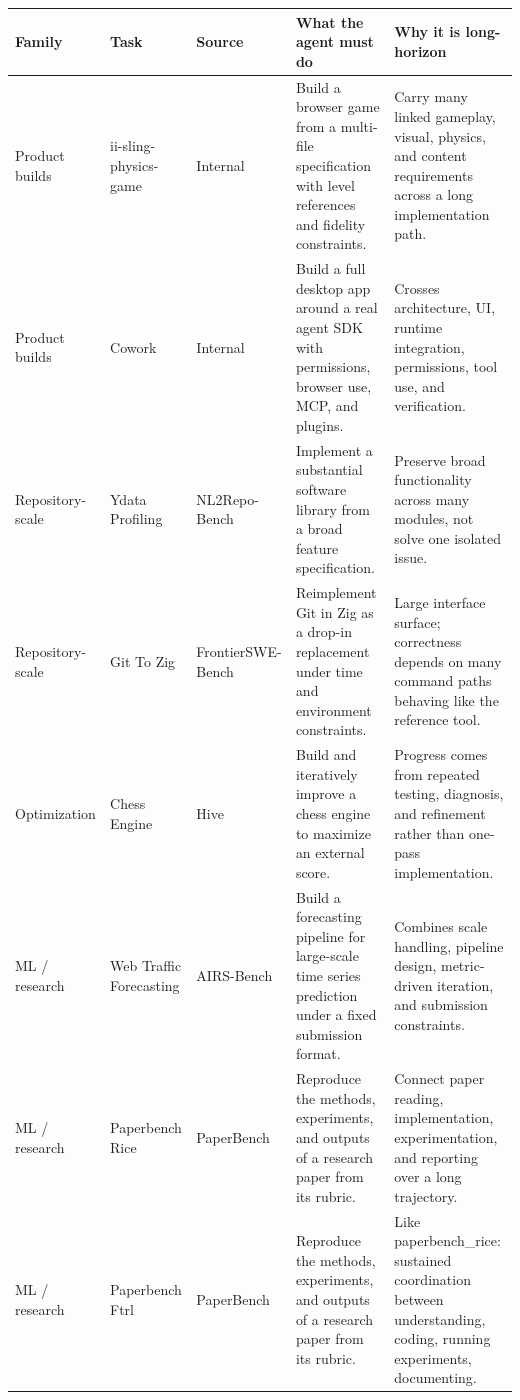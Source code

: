 \documentclass[11pt,a4paper]{article}
\renewcommand{\arraystretch}{1.18}
\newcommand{\code}[1]{#1}
\begin{document}
\begingroup
\renewcommand{\arraystretch}{1.25}
\setlength{\tabcolsep}{4pt}
\footnotesize
\noindent\begin{longtable}{@{}>{\raggedright\arraybackslash}p{2.0cm}>{\raggedright\arraybackslash}p{2.2cm}>{\raggedright\arraybackslash}p{1.8cm}>{\raggedright\arraybackslash}p{4.4cm}>{\raggedright\arraybackslash}p{4.4cm}@{}}
\toprule
\rowcolor{tablehead}\textbf{\color{white}Family} & \textbf{\color{white}Task} & \textbf{\color{white}Source} & \textbf{\color{white}What the agent must do} & \textbf{\color{white}Why it is long-horizon} \\
\midrule
\endhead
Product builds & \code{ii-sling-physics-game}\footnotemark[1] & Internal & Build a browser game from a multi-file specification with level references and fidelity constraints. & Carry many linked gameplay, visual, physics, and content requirements across a long implementation path. \\
\rowcolor{tableband}
Product builds & \code{Cowork} & Internal & Build a full desktop app around a real agent SDK with permissions, browser use, MCP, and plugins. & Crosses architecture, UI, runtime integration, permissions, tool use, and verification. \\
Repository-scale & \code{Ydata Profiling} & NL2Repo-Bench & Implement a substantial software library from a broad feature specification. & Preserve broad functionality across many modules, not solve one isolated issue. \\
\rowcolor{tableband}
Repository-scale & \code{Git To Zig} & FrontierSWE-Bench & Reimplement Git in Zig as a drop-in replacement under time and environment constraints. & Large interface surface; correctness depends on many command paths behaving like the reference tool. \\
Optimization & \code{Chess Engine} & Hive & Build and iteratively improve a chess engine to maximize an external score. & Progress comes from repeated testing, diagnosis, and refinement rather than one-pass implementation. \\
\rowcolor{tableband}
ML / research & \code{Web Traffic Forecasting} & AIRS-Bench & Build a forecasting pipeline for large-scale time series prediction under a fixed submission format. & Combines scale handling, pipeline design, metric-driven iteration, and submission constraints. \\
ML / research & \code{Paperbench Rice} & PaperBench & Reproduce the methods, experiments, and outputs of a research paper from its rubric. & Connect paper reading, implementation, experimentation, and reporting over a long trajectory. \\
\rowcolor{tableband}
ML / research & \code{Paperbench Ftrl} & PaperBench & Reproduce the methods, experiments, and outputs of a research paper from its rubric. & Like \code{paperbench\_rice}: sustained coordination between understanding, coding, running experiments, documenting. \\
\bottomrule
\end{longtable}
\endgroup
\end{document}

